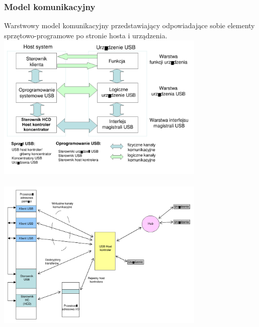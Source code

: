 		\subsubsection{Model komunikacyjny}
		Warstwowy model komunikacyjny przedstawiający odpowiadające sobie elementy sprzętowo-programowe po stronie hosta i urządzenia.
		\includegraphics[width=10cm]{./wyklady/USB_12_1.pdf}\\\\
		\includegraphics[width=10cm]{./wyklady/USB_13_1.pdf}\\
